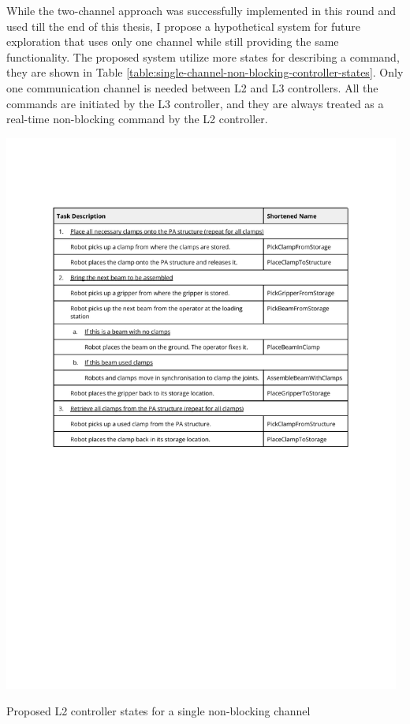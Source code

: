 While the two-channel approach was successfully implemented in this round and used till the end of this thesis, I propose a hypothetical system for future exploration that uses only one channel while still providing the same functionality. 
The proposed system utilize more states for describing a command, they are shown in Table \ref{table:single-channel-non-blocking-controller-states}. Only one communication channel is needed between L2 and L3 controllers. All the commands are initiated by the L3 controller, and they are always treated as a real-time non-blocking command by the L2 controller. 

\begin{table}[!h]
    \includegraphics[page=9, trim=25.4mm 175mm 25.4mm 33mm, clip, width=0.98\textwidth]{tables/Tables in Chapter 6.pdf}
    \caption{Proposed L2 controller states for a single non-blocking channel}
    \label{table:single-channel-non-blocking-controller-states}
\end{table}


